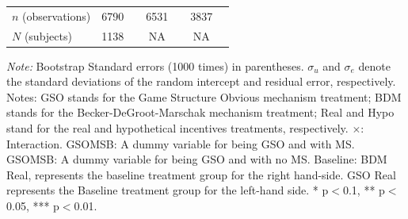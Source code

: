 \documentclass[12pt]{article}
\begin{document}
\begin{table}[H]
{\begin{tabular}{l*{3}{cc}}
\hline
\(n\) (observations)      &        6790         &            &        6531         &            &        3837         &            \\

\(N\) (subjects)       &        1138         &            &       NA         &            &        NA       &            \\
\hline\hline
\end{tabular}
}


\begin{tablenotes}
            \footnotesize
            \item \textit{Note:} Bootstrap Standard errors (1000 times) in parentheses. $\sigma_u$ and $\sigma_e$ denote the standard deviations of the random intercept and residual error, respectively. Notes: GSO stands for the Game Structure Obvious mechanism treatment; BDM stands for the Becker-DeGroot-Marschak mechanism treatment; Real and Hypo stand for the real and hypothetical incentives treatments, respectively. $\times$: Interaction. GSOMSB: A dummy variable for being GSO and with MS. GSOMSB: A dummy variable for being GSO and with no MS. Baseline: BDM Real, represents the baseline treatment group for the right hand-side. GSO Real represents the Baseline treatment group for the left-hand side. * p$<$0.1, ** p$<$0.05, *** p$<$0.01.
        \end{tablenotes}

\end{table}

\clearpage
\end{document}
